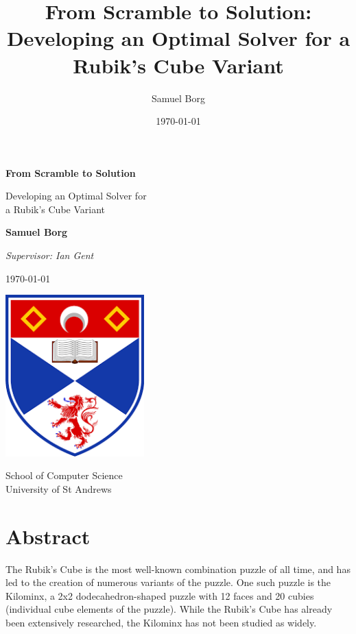 \documentclass[12pt]{report}
\title{From Scramble to Solution: Developing an Optimal Solver for a Rubik's Cube Variant}
\author{Samuel Borg}
\date{\today}
\begin{document}
\begin{titlepage}
    \begin{center}
        \vspace*{1.5cm}
            
        \Huge
        \textbf{From Scramble to Solution}
            
        \vspace{0.5cm}
        \LARGE
        Developing an Optimal Solver for \\a Rubik's Cube Variant

        \vspace{2cm}
        \textbf{Samuel Borg}

        \Large
        \textit{Supervisor: Ian Gent}

        \vspace{0.5cm}

        \large
        \today

        \vspace{3cm}

        \includegraphics[width=0.4\textwidth]{unilogo}

        \Large
        \vspace{0.5cm}
        School of Computer Science\\
        University of St Andrews
    \end{center}
\end{titlepage}

\chapter*{Abstract}
The Rubik's Cube is the most well-known combination puzzle of all time, and has led to the creation of numerous variants of the puzzle. One such puzzle is the Kilominx, a 2x2 dodecahedron-shaped puzzle with 12 faces and 20 cubies (individual cube elements of the puzzle). While the Rubik's Cube has already been extensively researched, the Kilominx has not been studied as widely.
\end{document}
